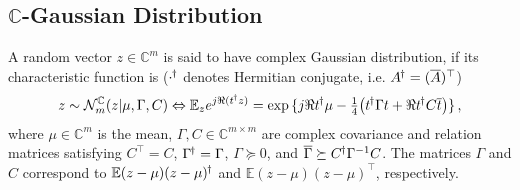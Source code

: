 \documentclass[a4paper,10pt]{article}
\newcommand{\cplx}{\mathbb{C}}
\newcommand{\hop}{{\mkern-1.5mu\dagger}}
\newcommand{\conj}[1]{\overline{#1}}
\begin{document}
\subsection{$\cplx$-Gaussian Distribution} %
\label{sub:c_gaussian_distribution}

A random vector $z\in \cplx^m$ is said to have complex Gaussian distribution, if its characteristic
function is (${\cdot}^\hop$ denotes Hermitian conjugate, i.e. $A^\hop = (\conj{A})^\top$)
$$
z \sim \mathcal{N}^\cplx_m(z \vert \mu, \Gamma, C)
  \Leftrightarrow
  \mathbb{E}_{z} e^{j \Re{(t^\hop z)}}
  = \exp{\{
    j \Re{t^\hop \mu} - \tfrac14 \bigl(
      t^\hop \Gamma t + \Re{t^\hop C \conj{t}}
    \bigr)
  \}}
  \,, $$
where $\mu \in \cplx^m$ is the mean, $\Gamma, C \in \cplx^{m\times m}$ are complex covariance
and relation matrices satisfying $C^\top = C$, $\Gamma^\hop = \Gamma$, $\Gamma \succeq 0$,
and $
  \conj{\Gamma} \succeq C^\hop \Gamma^{-1} C
$. The matrices $\Gamma$ and $C$ correspond to $
  \mathbb{E} (z - \mu)(z - \mu)^\hop
$ and $
  \mathbb{E} (z - \mu)(z - \mu)^\top
$, respectively.
%
\end{document}

